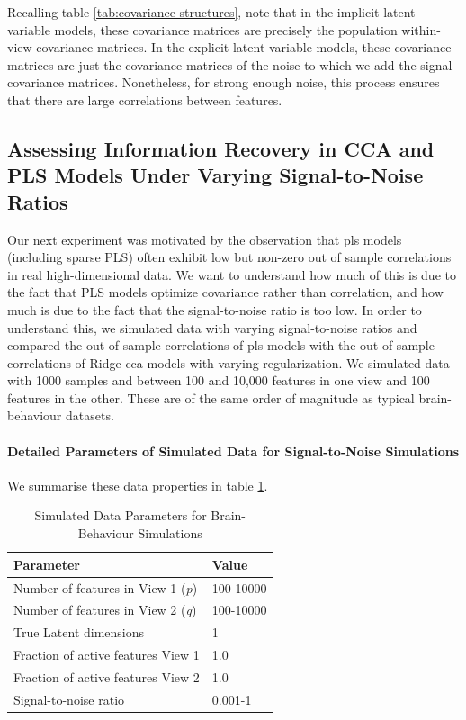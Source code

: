 Recalling table \ref{tab:covariance-structures}, note that in the implicit latent variable models, these covariance matrices are precisely the population within-view covariance matrices.
In the explicit latent variable models, these covariance matrices are just the covariance matrices of the noise to which we add the signal covariance matrices.
Nonetheless, for strong enough noise, this process ensures that there are large correlations between features.

\subsection{Assessing Information Recovery in CCA and PLS Models Under Varying Signal-to-Noise Ratios}

Our next experiment was motivated by the observation that \acrshort{pls} models (including sparse PLS) often exhibit low but non-zero out of sample correlations in real high-dimensional data.
We want to understand how much of this is due to the fact that PLS models optimize covariance rather than correlation, and how much is due to the fact that the signal-to-noise ratio is too low.
In order to understand this, we simulated data with varying signal-to-noise ratios and compared the out of sample correlations of \acrshort{pls} models with the out of sample correlations of Ridge \acrshort{cca} models with varying regularization.
We simulated data with 1000 samples and between 100 and 10,000 features in one view and 100 features in the other.
These are of the same order of magnitude as typical brain-behaviour datasets.

\paragraph{Detailed Parameters of Simulated Data for Signal-to-Noise Simulations}
We summarise these data properties in table \ref{tab:simulated-data-parameters-bb}.

\begin{table}
    \centering
    \caption{Simulated Data Parameters for Brain-Behaviour Simulations}
    \begin{tabular}{| l | l |}
        \hline
        \textbf{Parameter}                        & \textbf{Value}                               \\
        \hline
        Number of features in View 1 (\textit{p}) & 100-10000 \\
        Number of features in View 2 (\textit{q}) & 100-10000 \\
        True Latent dimensions                    & 1                                            \\
        Fraction of active features View 1            & 1.0                                          \\
        Fraction of active features View 2            & 1.0                                          \\
        Signal-to-noise ratio                    & 0.001-1 \\
        \hline
    \end{tabular}\label{tab:simulated-data-parameters-bb}
\end{table}

